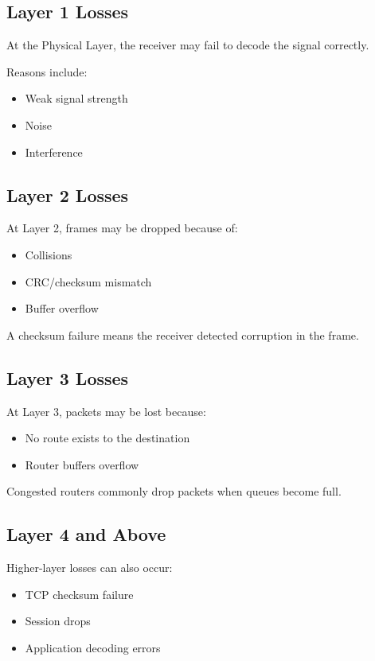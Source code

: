 \subsection{Layer 1 Losses}

At the Physical Layer, the receiver may fail to decode the signal correctly.

Reasons include:
\begin{itemize}[leftmargin=1.5em]
    \item Weak signal strength
    \item Noise
    \item Interference
\end{itemize}

\subsection{Layer 2 Losses}

At Layer 2, frames may be dropped because of:

\begin{itemize}[leftmargin=1.5em]
    \item Collisions
    \item CRC/checksum mismatch
    \item Buffer overflow
\end{itemize}

A checksum failure means the receiver detected corruption in the frame.

\subsection{Layer 3 Losses}

At Layer 3, packets may be lost because:
\begin{itemize}[leftmargin=1.5em]
    \item No route exists to the destination
    \item Router buffers overflow
\end{itemize}

Congested routers commonly drop packets when queues become full.

\subsection{Layer 4 and Above}

Higher-layer losses can also occur:
\begin{itemize}[leftmargin=1.5em]
    \item TCP checksum failure
    \item Session drops
    \item Application decoding errors
\end{itemize}

